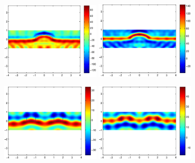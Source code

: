 \documentclass[12pt]{iopart}
\begin{document}
\begin{figure}
	\centering
	\includegraphics[width=0.45\textwidth]{./figure_rough/hemicircle_multi}
	\includegraphics[width=0.45\textwidth]{./figure_rough/hemicircle_multi_real}
	\caption{}\label{I1}
\end{figure}
\begin{figure}
	\centering
	\includegraphics[width=0.45\textwidth]{./figure_rough/Bisq_1}
	\includegraphics[width=0.45\textwidth]{./figure_rough/Bisq_1_real}
	\caption{}\label{I1}
\end{figure}
\end{document}
